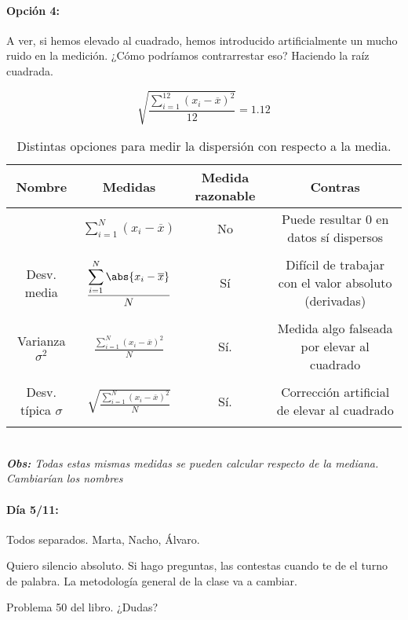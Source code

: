 \paragraph{Opción 4:} A ver, si hemos elevado al cuadrado, hemos introducido artificialmente un mucho ruido en la medición. ¿Cómo podríamos contrarrestar eso? Haciendo la raíz cuadrada.

\[ \sqrt{\frac{\displaystyle\sum_{i=1}^{12} \left(x_i-\overline{x}\right)^2}{12}} = 1.12\]

\begin{table}[hbtp]
\centering
\label{SD:medidasDispersion}
\caption{Distintas opciones para medir la dispersión con respecto a la media.}
\begin{tabular}{c|ccc}
\textbf{Nombre} & \textbf{Medidas} & \textbf{Medida razonable} & \textbf{Contras}\\\hline\hline
 & $\displaystyle\sum_{i=1}^{N} (x_i-\overline{x})$ & No & Puede resultar 0 en datos sí dispersos\\\\
Desv. media  & $\displaystyle\frac{\displaystyle\sum_{i=1}^{N} \abs{x_i-\overline{x}}}{N}$ & Sí & Difícil de trabajar con el valor absoluto (derivadas)\\\\
Varianza $\sigma^2$ & $\displaystyle \frac{\displaystyle\sum_{i=1}^{N} \left(x_i-\overline{x}\right)^2}{N}$ & Sí. & Medida algo falseada por elevar al cuadrado\\\\
Desv. típica $\sigma$ & $\displaystyle \sqrt{\frac{\displaystyle\sum_{i=1}^{N} \left(x_i-\overline{x}\right)^2}{N}}$ &Sí. & Corrección artificial de elevar al cuadrado\\\\\hline
\end{tabular}
\\
\textit{\textbf{Obs:} Todas estas mismas medidas se pueden calcular respecto de la mediana. Cambiarían los nombres}
\end{table}

\paragraph{Día 5/11:} Todos separados. Marta, Nacho, Álvaro.

Quiero silencio absoluto. Si hago preguntas, las contestas cuando te de el turno de palabra. 
%
La metodología general de la clase va a cambiar. 
%


Problema 50 del libro. ¿Dudas? 

